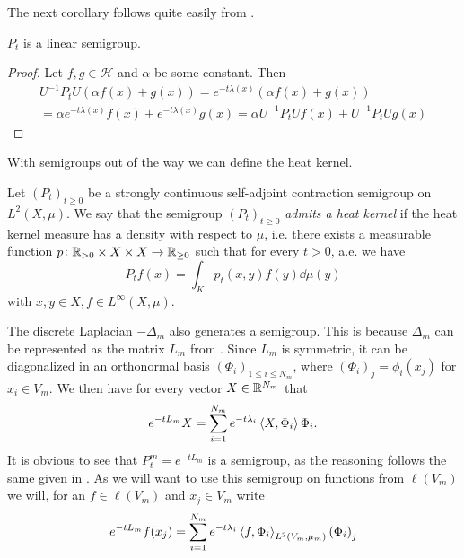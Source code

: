 The next corollary follows quite easily from .
\begin{coro}\label{coro:PtIsLinear}
	$P_t$ is a linear semigroup.
\end{coro}
\begin{proof}
	Let $f,g \in \mathcal{H}$ and $\alpha$ be some constant. Then 
	\begin{multline}
		U^{-1}P_tU\left(\alpha f(x) + g(x)\right) = e^{-t \lambda(x)}\left(\alpha f(x) + g(x)\right) \\
		= \alpha e^{-t \lambda(x)}f(x) + e^{-t \lambda(x)}g(x) = \alpha U^{-1}P_tU f(x) + U^{-1}P_tU g(x)
	\end{multline}
\end{proof}

With semigroups out of the way we can define the heat kernel.

\medskip
\begin{defi}\label{heatKernel}
	Let $(P_t)_{t \geq 0}$ be a strongly continuous self-adjoint contraction semigroup on $L^2(X, \mu)$. We say that the semigroup $(P_t)_{t \geq 0}$ \emph{admits a heat kernel} if the heat kernel measure has a density with respect to $\mu$, i.e. there exists a measurable function $p\colon \mathbb{R}_{> 0} \times X \times X \to \mathbb{R}_{\geq 0}$ such that for every $t > 0$, a.e. we have
	\begin{equation}
		P_tf(x) = \int_{K}p_t(x,y)f(y) \dd \mu(y)
	\end{equation}
	with $x,y \in X, f \in L^{\infty}(X, \mu)$.
\end{defi}

\medskip
\begin{remark}\label{remark:DiscreteLaplacianSemiGroup}
	The discrete Laplacian $-\Delta_m$ also generates a semigroup. This is because $\Delta_m$ can be represented as the matrix $L_m$ from . Since $L_m$ is symmetric, it can be diagonalized in an orthonormal basis $(\Phi_i)_{1 \leq i \leq N_m}$, where $(\Phi_i)_j = \phi_i(x_j)$ for $x_i \in V_m$. We then have for every vector $X \in \mathbb{R}^{N_m}$ that
	\begin{equation}
		e^{-tL_m}X = \sum_{i =1 }^{N_m} e^{-t \lambda_i}\inn{X}{\Phi_i}\Phi_i.
	\end{equation}
 	It is obvious to see that $P_t^{m} = e^{-tL_m}$ is a semigroup, as the reasoning follows the same given in . 	As we will want to use this semigroup on functions from $\ell(V_m)$ we will, for an $f \in \ell(V_m)$ and $x_j \in V_m$ write
	\begin{equation}
		e^{-tL_m}f(x_j) = \sum_{i=1}^{N_m} e^{-t \lambda_i} \inn{f}{\Phi_i}_{L^{2}(V_m, \mu_m)}\left(\Phi_i\right)_{j}
	\end{equation}
\end{remark}

